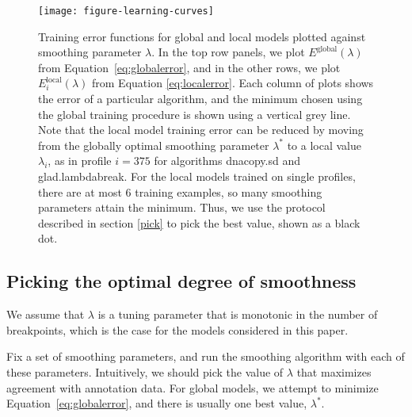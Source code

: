 \documentclass{bioinfo}
\begin{document}
\begin{methods}
\begin{figure*}
\texttt{[image: figure-learning-curves]}
\caption{\label{figure-learning-curves} Training error functions for
  global and local models plotted against smoothing parameter
  $\lambda$. In the top row panels, we plot
  $E^{\text{global}}(\lambda)$ from Equation~\ref{eq:globalerror}, and
  in the other rows, we plot $E^{\text{local}}_i(\lambda)$ from
  Equation \ref{eq:localerror}. Each column of plots shows the error
  of a particular algorithm, and the minimum chosen using the global
  training procedure is shown using a vertical grey line. Note that
  the local model training error can be reduced by moving from the
  globally optimal smoothing parameter $\lambda^*$ to a local value
  $\lambda_i$, as in profile $i=375$ for algorithms
  dnacopy.sd and glad.lambdabreak. For the local models trained on
  single profiles, there are at most 6 training examples, so many
  smoothing parameters attain the minimum. Thus, we use the protocol
  described in section \ref{pick} to pick the best value, shown as a
  black dot.}
\end{figure*}

\label{quantify}

\subsection{Picking the optimal degree of smoothness}

We assume that $\lambda$ is a tuning parameter that is monotonic in
the number of breakpoints, which is the case for the models considered
in this paper.

Fix a set of smoothing parameters, and run the
smoothing algorithm with each of these parameters. Intuitively, we
should pick the value of $\lambda$ that maximizes agreement with
annotation data. For global models, we attempt to minimize
Equation~\ref{eq:globalerror}, and there is usually one best value,
$\lambda^*$.


\end{methods}
\end{document}

